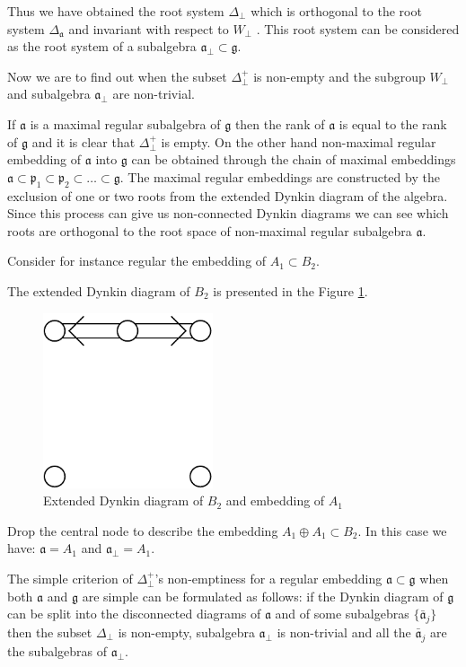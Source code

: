 \documentclass[a4paper,12pt]{article}
\theoremstyle{definition} \newtheorem{Def}{Definition}
\begin{document}
Thus we have obtained the root system $\Delta_{\bot}$ which is orthogonal to the root
system $\Delta_{\mathfrak{a}}$ and invariant with respect to  $W_{\bot}$ . This root system
can be considered as the root system of a subalgebra $\mathfrak{a}_{\bot}\subset \mathfrak{g}$.

Now we are to find out when the subset $\Delta^{+}_{\bot}$ is non-empty
and the subgroup $W_{\bot}$ and subalgebra $\mathfrak{a}_{\bot}$ are non-trivial.

If $\mathfrak{a}$ is a maximal regular subalgebra of $\mathfrak{g}$ then
the rank of $\mathfrak{a}$ is equal to the rank of $\mathfrak{g}$ and
it is clear that $\Delta^{+}_{\bot}$ is empty.
On the other hand
non-maximal regular embedding of $\mathfrak{a}$ into $\mathfrak{g}$ can be obtained
through the chain of maximal embeddings
$\mathfrak{a}\subset \mathfrak{p}_1\subset \mathfrak{p}_2\subset\dots \subset \mathfrak{g}$.
The maximal regular embeddings are constructed by the exclusion of one or two roots
from the extended Dynkin diagram of the algebra. Since this process can give us
non-connected Dynkin diagrams we can see which roots are orthogonal to the root
space of non-maximal regular subalgebra $\mathfrak{a}$.

Consider for instance regular the embedding of $A_1\subset B_2$.

The extended Dynkin diagram of $B_2$ is presented in the Figure \ref{fig:B2Dynkin}.
\begin{figure}[ph]
  \centering
  \includegraphics[width=50mm]{B2_A1_diagram.pdf}
  \caption{Extended Dynkin diagram of $B_2$ and embedding of $A_1$}
  \label{fig:B2Dynkin}
\end{figure}
Drop the central node to describe the embedding $A_1\oplus A_1\subset B_2$.
In this case we have: $\mathfrak{a}=A_1$ and $\mathfrak{a}_{\bot}=A_1$.

The simple criterion of $\Delta^{+}_{\bot}$'s non-emptiness for a regular
embedding $\mathfrak{a}\subset \mathfrak{g}$
when both $\mathfrak{a}$ and $\mathfrak{g}$ are simple can be formulated
as follows:
if the Dynkin diagram of $\mathfrak{g}$ can be split into the disconnected
diagrams of $\mathfrak{a}$ and of some subalgebras $\{\mathfrak{\bar{a}}_j\}$
then the subset $\Delta_{\bot}$ is non-empty,
subalgebra $\mathfrak{a}_{\bot}$ is non-trivial and all the
$\mathfrak{\bar{a}}_j$ are the subalgebras of $\mathfrak{a}_{\bot}$.
\end{document}
